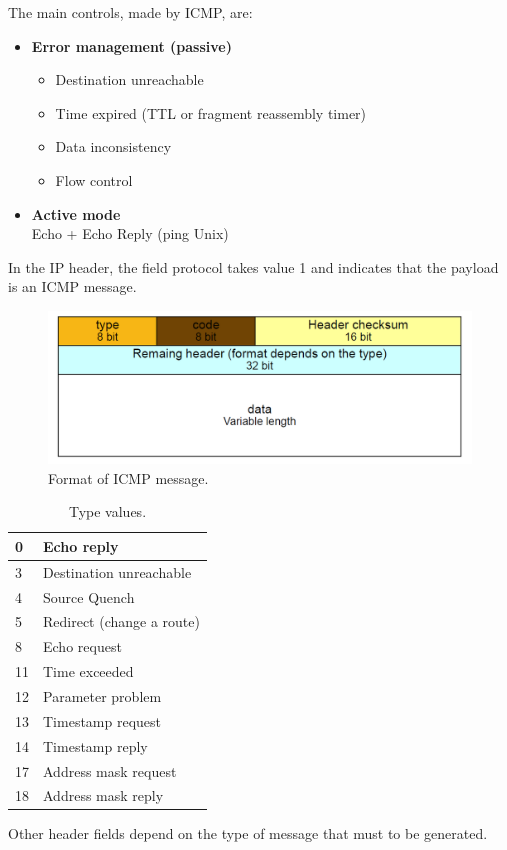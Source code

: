 The main controls, made by ICMP, are: 
\begin{itemize}
\item{\textbf{Error management (passive)}
\begin{itemize}
\item{Destination unreachable}
\item{Time expired (TTL or fragment reassembly timer)}
\item{Data inconsistency}
\item{Flow control}
\end{itemize}
}
\item{\textbf{Active mode}\\
Echo + Echo Reply (ping Unix)
}\\
\end{itemize}
In the IP header, the field protocol takes value 1 and indicates that the payload is an ICMP message.
\begin{figure}[H]
\centering
\includegraphics[scale=0.35, angle=0]{./Images/ICMP/ICMP_message_format}
\caption{\footnotesize{Format of ICMP message.}}
\end{figure}
\begin{table}[H]
\centering \footnotesize
\begin{tabular}{|l|l|}
\hline
0 & {Echo reply}\\
\hline
3 & {Destination unreachable}\\
\hline
4 & {Source Quench}\\
\hline
5 & {Redirect (change a route)}\\
\hline
8 & {Echo request}\\
\hline
11 & {Time exceeded}\\
\hline
12 & {Parameter problem}\\
\hline
13 & {Timestamp request}\\
\hline
14 & {Timestamp reply}\\
\hline
17 & {Address mask request}\\
\hline
18 & {Address mask reply}\\
\hline
\end{tabular}
\caption{Type values.}
\end{table}
Other header fields depend on the type of message that must to be generated.
